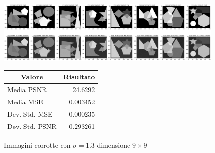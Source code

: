 \begin{figure}[H]
    \centering
    \begin{minipage}[h]{0.5\textwidth}
        \centering
    \includegraphics[width=\linewidth]{imgRel/datasetcorrotto/datasetcorrotto9x9.png}\label{fig:imgcorrotte3}
    \end{minipage}%
    \begin{minipage}[h]{0.5\textwidth}
        \centering
        \begin{tabular}{|lr|}
            \hline
            \multicolumn{1}{|c}{\textbf{Valore}} & \multicolumn{1}{c|}{\textbf{Risultato}} \\ \hline
                Media PSNR & 24.6292 \\ 
                Media MSE & 0.003452 \\ 
                Dev. Std. MSE & 0.000235 \\ 
                Dev. Std. PSNR & 0.293261 \\ \hline
            \end{tabular}\label{tab:tabcorrotte3}
    \end{minipage}
    \captionsetup{labelformat=andtable}
    \caption{Immagini corrotte con $\sigma = 1.3$ dimensione $9 \times 9$}
\end{figure}
